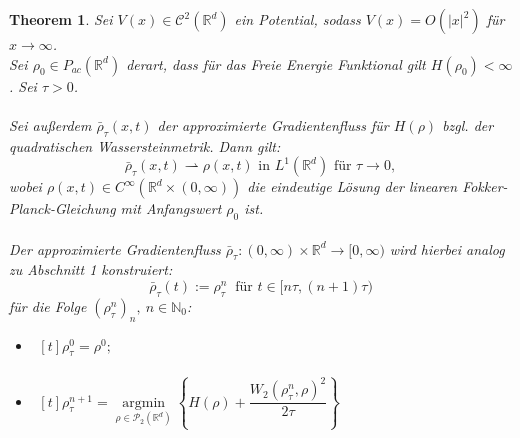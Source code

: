 \documentclass[11pt,a4paper,notitlepage]{scrreprt}
\newcommand{\RR}{\mathbb{R}}
\newcommand{\NN}{\mathbb{N}}
\newtheorem{theorem}[defi]{Theorem}
\begin{document}
\begin{theorem}
Sei $V(x)\in \mathcal{C}^2(\RR^d)$ ein Potential, sodass $V(x)=O(\vert x \vert^2)$ für $x\to\infty$. \\
Sei $\rho_0\in P_{ac}(\RR^d)$ derart, dass für das Freie Energie Funktional gilt $H(\rho_0)<\infty$. Sei $\tau>0$.\\\\
Sei außerdem $\bar{\rho}_\tau(x,t)$ der approximierte Gradientenfluss für $H(\rho)$ bzgl. der quadratischen Wassersteinmetrik. 
Dann gilt: \\
\begin{equation*}
\bar{\rho}_\tau(x,t)\rightharpoonup \rho(x,t) \text{ in } L^1(\RR^d) \text{ für } \tau\to 0,
\end{equation*}
wobei $\rho(x,t)\in C^\infty(\RR^d\times(0,\infty))$ die eindeutige Lösung der linearen Fokker-Planck-Gleichung mit Anfangswert $\rho_0$ ist. \\\\
Der approximierte Gradientenfluss $\bar{\rho}_\tau:(0,\infty)\times\RR^d\to[0,\infty)$ wird hierbei analog zu Abschnitt 1 konstruiert:
\begin{equation*}
\bar{\rho}_\tau(t):=\rho_\tau^n ~\text{ für }t\in[n\tau,(n+1)\tau)
\end{equation*}
für die Folge $(\rho_\tau^n)_n,~n\in\NN_0$:
\begin{itemize}
\item[i)]$\begin{aligned}[t]\rho_\tau^0=\rho^0; \end{aligned}$
\item[ii)]$\begin{aligned}[t]
\rho_\tau^{n+1}=\underset{\rho\in\mathcal{P}_{2}(\RR^d)}{\operatorname{argmin}}\left\{H(\rho)+\dfrac{W_2(\rho_\tau^n,\rho)^2}{2\tau}\right\}
\end{aligned}$\end{itemize}
\end{theorem}
\end{document}
